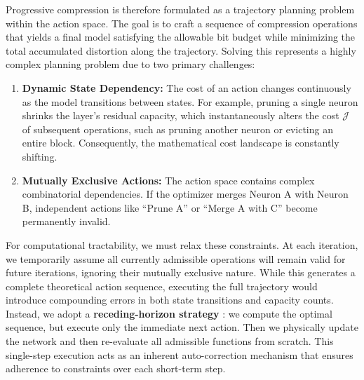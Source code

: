 \documentclass[11pt, a4paper, copyright, gdm]{google}
\newcommand{\calJ}{\mathcal{J}}
\theoremstyle{definition}
\begin{document}
Progressive compression is therefore formulated as a trajectory planning problem within the action space. The goal is to craft a sequence of compression operations that yields a final model satisfying the allowable bit budget while minimizing the total accumulated distortion along the trajectory. Solving this represents a highly complex planning problem due to two primary challenges:
\begin{enumerate}
    \item \textbf{Dynamic State Dependency:} The cost of an action changes continuously as the model transitions between states. For example, pruning a single neuron shrinks the layer's residual capacity, which instantaneously alters the cost $\calJ$ of subsequent operations, such as pruning another neuron or evicting an entire block. Consequently, the mathematical cost landscape is constantly shifting.
	\item \textbf{Mutually Exclusive Actions:} The action space contains complex combinatorial dependencies. If the optimizer merges Neuron A with Neuron B, independent actions like ``Prune A'' or ``Merge A with C'' become permanently invalid.
\end{enumerate}
For computational tractability, we must relax these constraints. At each iteration, we temporarily assume all currently admissible operations will remain valid for future iterations, ignoring their mutually exclusive nature. While this generates a complete theoretical action sequence, executing the full trajectory would introduce compounding errors in both state transitions and capacity counts. Instead, we adopt a \textbf{receding-horizon strategy} \cite{camacho2013model, bertsekas2012dynamic}: we compute the optimal sequence, but execute only the immediate next action. Then we physically update the network and then re-evaluate all admissible functions from scratch. This single-step execution acts as an inherent auto-correction mechanism that ensures adherence to constraints over each short-term step.
\end{document}
